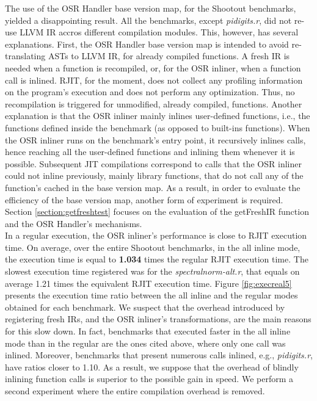 The use of the OSR Handler base version map, for the Shootout benchmarks, yielded a disappointing result.
All the benchmarks, except \textit{pidigits.r}, did not re-use LLVM IR accros different compilation modules.
This, however, has several explanations.
First, the OSR Handler base version map is intended to avoid re-translating ASTs to LLVM IR, for already compiled functions.
A fresh IR is needed when a function is recompiled, or, for the OSR inliner, when a function call is inlined.
RJIT, for the moment, does not collect any profiling information on the program's execution and does not perform any optimization. 
Thus, no recompilation is triggered for unmodified, already compiled, functions.
Another explanation is that the OSR inliner mainly inlines user-defined functions, i.e., the functions defined inside the benchmark (as opposed to built-ins functions).
When the OSR inliner runs on the benchmark's entry point, it recursively inlines calls, hence reaching all the user-defined functions and inlining them whenever it is possible.
Subsequent JIT compilations correspond to calls that the OSR inliner could not inline previously, mainly library functions, that do not call any of the function's cached in the base version map.
As a result, in order to evaluate the efficiency of the base version map, another form of experiment is required.
Section \ref{section:getfreshtest} focuses on the evaluation of the getFreshIR function and the OSR Handler's mechanisms.\\

In a regular execution, the OSR inliner's performance is close to RJIT execution time.
On average, over the entire Shootout benchmarks, in the all inline mode, the execution time is equal to \textbf{1.034} times the regular RJIT execution time.
The slowest execution time registered was for the \textit{spectralnorm-alt.r}, that equals on average 1.21 times the equivalent RJIT execution time.
Figure \ref{fig:execreal5} presents the execution time ratio between the all inline and the regular modes obtained for each benchmark.
We suspect that the overhead introduced by registering fresh IRs, and the OSR inliner's transformations, are the main reasons for this slow down.
In fact, benchmarks that executed faster in the all inline mode than in the regular are the ones cited above, where only one call was inlined.
Moreover, benchmarks that present numerous calls inlined, e.g., \textit{pidigits.r}, have ratios closer to 1.10.
As a result, we suppose that the overhead of blindly inlining function calls is superior to the possible gain in speed. 
We perform a second experiment where the entire compilation overhead is removed.\\


